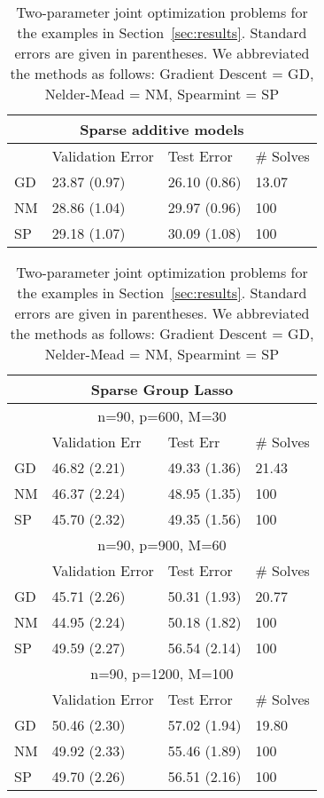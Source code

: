 \documentclass[12pt,letterpaper]{article}
\begin{document}
\begin{table}
	\caption {\label{tab:two_params} Two-parameter joint optimization problems for the examples in Section~\ref{sec:results}. Standard errors are given in parentheses. We abbreviated the methods as follows: Gradient Descent = GD, Nelder-Mead = NM, Spearmint = SP}
	\centering
	\begin{tabular}{| l | l | l | l | }
	\hline
	\multicolumn{4}{|c|}{Sparse additive models}\\
	\hline
	& Validation Error & Test Error & \# Solves\\
	\hline
	GD & 23.87 (0.97) & 26.10 (0.86) & 13.07 \\
	\hline
	NM & 28.86 (1.04) & 29.97 (0.96) & 100 \\
	\hline
	SP & 29.18 (1.07) & 30.09 (1.08) & 100 \\
	\hline
	\end{tabular}

	\vspace{0.5cm}

	\begin{tabular}{| l | l | l | l | }
		\hline
		\multicolumn{4}{|c|}{Sparse Group Lasso}\\
		\hline
		\multicolumn{4}{|c|}{n=90, p=600, M=30}\\
		\hline
		& Validation Err & Test Err & \# Solves \\
		\hline
		GD & 46.82 (2.21) & 49.33 (1.36)& 21.43\\
		\hline
		NM & 46.37 (2.24) & 48.95 (1.35) & 100 \\
		\hline
		SP &  45.70 (2.32) & 49.35 (1.56) & 100 \\
		\hline
		\multicolumn{4}{|c|}{n=90, p=900, M=60}\\
		\hline
		 & Validation Error & Test Error & \# Solves \\
		\hline
		GD  & 45.71 (2.26) & 50.31 (1.93) & 20.77\\
		\hline
		NM  & 44.95 (2.24) & 50.18 (1.82) & 100  \\
		\hline
		SP  & 49.59 (2.27) & 56.54 (2.14) & 100 \\
		\hline
		\multicolumn{4}{|c|}{n=90, p=1200, M=100}\\
		\hline
		&  Validation Error & Test Error & \# Solves \\
		\hline
		GD & 50.46 (2.30) & 57.02 (1.94) & 19.80 \\
		\hline
		NM & 49.92 (2.33) & 55.46 (1.89) & 100 \\
		\hline
		SP  & 49.70 (2.26) & 56.51 (2.16) & 100 \\
		\hline
	\end{tabular}
	

\end{table}
\end{document}
